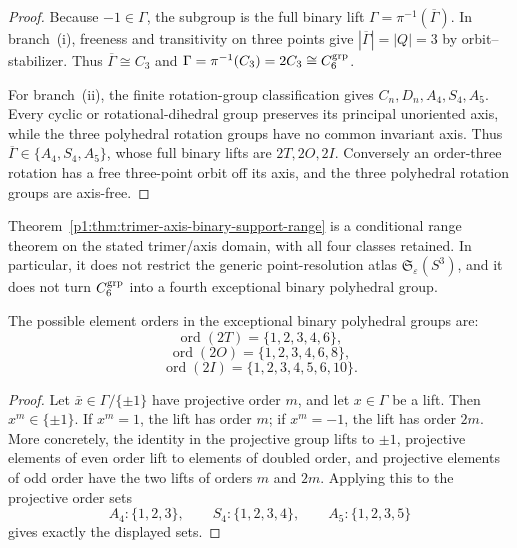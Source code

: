 \documentclass[11pt]{article}
\begin{document}
\begin{proof}
Because \(-1\in\Gamma\), the subgroup is the full binary lift
\(\Gamma=\pi^{-1}(\overline\Gamma)\).  In branch~(i), freeness and
transitivity on three points give
\(|\overline\Gamma|=|Q|=3\) by orbit--stabilizer.  Thus
\(\overline\Gamma\cong C_3\) and
\(\Gamma=\pi^{-1}(C_3)=2C_3\cong C_6^{\rm grp}\).

For branch~(ii), the finite rotation-group classification gives
\(C_n,D_n,A_4,S_4,A_5\).  Every cyclic or rotational-dihedral group preserves
its principal unoriented axis, while the three polyhedral rotation groups
have no common invariant axis.  Thus
\(\overline\Gamma\in\{A_4,S_4,A_5\}\), whose full binary lifts are
\(2T,2O,2I\).  Conversely an order-three rotation has a free three-point
orbit off its axis, and the three polyhedral rotation groups are axis-free.
\end{proof}

\begin{remark}
\label{p1:rem:trimer-axis-range-not-occurrence}
Theorem~\ref{p1:thm:trimer-axis-binary-support-range} is a conditional range
theorem on the stated trimer/axis domain, with all four classes retained.
In particular, it does not restrict the generic point-resolution atlas
\(\mathfrak S_\varepsilon(S^3)\), and it does not turn
\(C_6^{\rm grp}\) into a fourth exceptional binary polyhedral group.
\end{remark}

\begin{proposition}
\label{p1:prop:element-orders}
The possible element orders in the exceptional binary polyhedral groups are:
\[
\operatorname{ord}(2T)=\{1,2,3,4,6\},
\]
\[
\operatorname{ord}(2O)=\{1,2,3,4,6,8\},
\]
\[
\operatorname{ord}(2I)=\{1,2,3,4,5,6,10\}.
\]
\end{proposition}

\begin{proof}
Let \(\bar x\in \Gamma/\{\pm1\}\) have projective order \(m\), and let \(x\in\Gamma\)
be a lift.  Then \(x^m\in\{\pm1\}\).  If \(x^m=1\), the lift has order \(m\); if
\(x^m=-1\), the lift has order \(2m\).  More concretely, the identity in the
projective group lifts to \(\pm1\), projective elements of even order lift to
elements of doubled order, and projective elements of odd order have the two lifts
of orders \(m\) and \(2m\).  Applying this to the projective order sets
\[
A_4:\{1,2,3\},\qquad S_4:\{1,2,3,4\},\qquad A_5:\{1,2,3,5\}
\]
gives exactly the displayed sets.
\end{proof}
\end{document}
